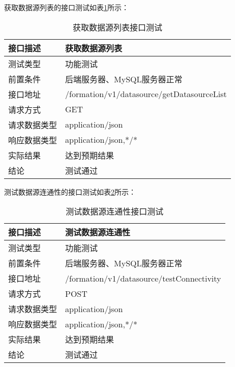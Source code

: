 获取数据源列表的接口测试如表\ref{tab:exampletable2}所示：

\begin{table}[H]
  \centering
  \caption{获取数据源列表接口测试}
  \label{tab:exampletable2}
  \begin{tabular}{ll}
    \toprule
    接口描述         & 获取数据源列表         \\
    \midrule
    测试类型         & 功能测试         \\
    前置条件         & 后端服务器、MySQL服务器正常         \\
    接口地址       & /formation/v1/datasource/getDatasourceList         \\
    请求方式         & GET      \\
    请求数据类型         & application/json     \\
    响应数据类型         & application/json,*/*           \\
    实际结果         & 达到预期结果           \\
    结论            & 测试通过           \\
    \bottomrule
  \end{tabular}
\end{table}

测试数据源连通性的接口测试如表\ref{tab:exampletable3}所示：

\begin{table}[H]
  \centering
  \caption{测试数据源连通性接口测试}
  \label{tab:exampletable3}
  \begin{tabular}{ll}
    \toprule
    接口描述         & 测试数据源连通性         \\
    \midrule
    测试类型         & 功能测试         \\
    前置条件         & 后端服务器、MySQL服务器正常         \\
    接口地址       & /formation/v1/datasource/testConnectivity         \\
    请求方式         & POST      \\
    请求数据类型         & application/json     \\
    响应数据类型         & application/json,*/*           \\
    实际结果         & 达到预期结果           \\
    结论            & 测试通过           \\
    \bottomrule
  \end{tabular}
\end{table}

